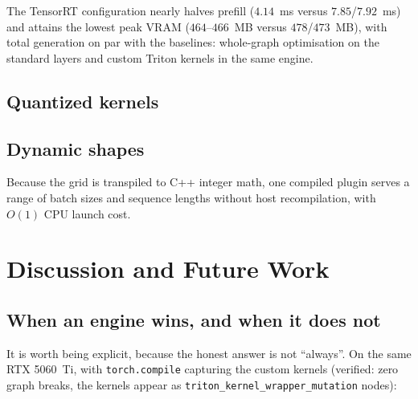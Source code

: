 \documentclass[11pt,a4paper]{article}
\begin{document}
The TensorRT configuration nearly halves prefill ($4.14$~ms versus
$7.85$/$7.92$~ms) and attains the lowest peak VRAM ($464$--$466$~MB versus
$478$/$473$~MB), with total generation on par with the baselines: whole-graph
optimisation on the standard layers and custom Triton kernels in the same engine.

\subsection{Quantized kernels}

\begin{table}[h!]
\centering
\small
{}
\caption{Quantized GEMMs on the RTX 5060~Ti (\texttt{sm\_120a}), where PTX ISA
clamping is exercised. Both reach exact parity with native Triton.}
\label{tab:quant}
\end{table}

\subsection{Dynamic shapes}

Because the grid is transpiled to C++ integer math, one compiled plugin serves a
range of batch sizes and sequence lengths without host recompilation, with
$O(1)$ CPU launch cost.

\section{Discussion and Future Work}

\subsection{When an engine wins, and when it does not}
\label{sec:enginewins}

It is worth being explicit, because the honest answer is not ``always''. On the
same RTX 5060~Ti, with \texttt{torch.compile} capturing the custom kernels
(verified: zero graph breaks, the kernels appear as
\texttt{triton\_kernel\_wrapper\_mutation} nodes):
\end{document}
